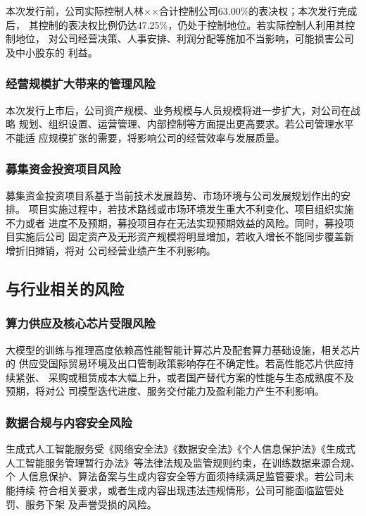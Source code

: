 本次发行前，公司实际控制人林××合计控制公司63.00\%的表决权；本次发行完成后，
其控制的表决权比例仍达47.25\%，仍处于控制地位。若实际控制人利用其控制地位，
对公司经营决策、人事安排、利润分配等施加不当影响，可能损害公司及中小股东的
利益。

\subsubsection{经营规模扩大带来的管理风险}

本次发行上市后，公司资产规模、业务规模与人员规模将进一步扩大，对公司在战略
规划、组织设置、运营管理、内部控制等方面提出更高要求。若公司管理水平不能适
应规模扩张的需要，将影响公司的经营效率与发展质量。

\subsubsection{募集资金投资项目风险}

募集资金投资项目系基于当前技术发展趋势、市场环境与公司发展规划作出的安排。
项目实施过程中，若技术路线或市场环境发生重大不利变化、项目组织实施不力或者
进度不及预期，募投项目存在无法实现预期效益的风险。同时，募投项目实施后公司
固定资产及无形资产规模将明显增加，若收入增长不能同步覆盖新增折旧摊销，将对
公司经营业绩产生不利影响。

\subsection{与行业相关的风险}

\subsubsection{算力供应及核心芯片受限风险}

大模型的训练与推理高度依赖高性能智能计算芯片及配套算力基础设施，相关芯片的
供应受国际贸易环境及出口管制政策影响存在不确定性。若高性能芯片供应持续紧张、
采购或租赁成本大幅上升，或者国产替代方案的性能与生态成熟度不及预期，将对公
司模型迭代进度、服务交付能力及盈利能力产生不利影响。

\subsubsection{数据合规与内容安全风险}

生成式人工智能服务受《网络安全法》《数据安全法》《个人信息保护法》《生成式
人工智能服务管理暂行办法》等法律法规及监管规则约束，在训练数据来源合规、个
人信息保护、算法备案与生成内容安全等方面须持续满足监管要求。若公司未能持续
符合相关要求，或者生成内容出现违法违规情形，公司可能面临监管处罚、服务下架
及声誉受损的风险。

